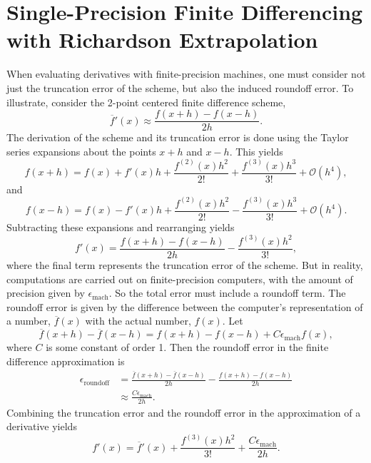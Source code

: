\documentclass[11pt]{article}
\begin{document}
\section{Single-Precision Finite Differencing with Richardson Extrapolation}
When evaluating derivatives with finite-precision machines, one must consider not just the truncation error of the scheme,
but also the induced roundoff error. To illustrate, consider the 2-point centered finite difference scheme,
\begin{equation}
\overline{f}'(x) \approx \frac{f(x+h) - f(x-h)}{2h}.
\end{equation}
The derivation of the scheme and its truncation error is done using the Taylor series expansions about the points
 $x+h$ and $x-h$. This yields
\begin{equation}
f(x+h) = f(x) + f'(x) h + \frac{f^{(2)}(x) h^2}{2!} + \frac{f^{(3)}(x) h^3}{3!} + \mathcal{O}(h^4),
\end{equation}
and
\begin{equation}
f(x-h) = f(x) - f'(x) h + \frac{f^{(2)}(x) h^2}{2!} - \frac{f^{(3)}(x) h^3}{3!} + \mathcal{O}(h^4).
\end{equation}
Subtracting these expansions and rearranging yields
\begin{equation}
f'(x) = \frac{ f(x+h) - f(x-h) } { 2 h } - \frac{f^{(3)}(x) h^2}{3!},
\end{equation}
where the final term represents the truncation error of the scheme. But in reality, computations are carried out on
finite-precision computers, with the amount of precision given by $\epsilon_{\text{mach}}$. So the total error must 
include a roundoff term. The roundoff error is given by the difference
between the computer's representation of a number, $\overline{f}(x)$ with the actual number, $f(x)$. Let
\begin{equation}
\overline{f}(x+h) - \overline{f}(x-h) =  f(x+h) - f(x-h) + C \epsilon_{\text{mach}} f(x),
\end{equation}
where $C$ is some constant of order 1. Then the roundoff error in the finite difference approximation is
\begin{align*}
\epsilon_{\text{roundoff}} &= \frac{ \overline{f}(x+h) - \overline{f}(x-h) } { 2 h } - \frac{ f(x+h) - f(x-h) } { 2 h } \\
& \approx \frac{ C \epsilon_{\text{mach}} } {2 h }.
\end{align*}
Combining the truncation error and the roundoff error in the approximation of a derivative yields
\begin{equation}
f'(x) = \overline{f}'(x) + \frac{f^{(3)}(x) h^2}{3!} + \frac{ C \epsilon_{\text{mach}} } {2 h }.
\label{error}
\end{equation}
\end{document}
